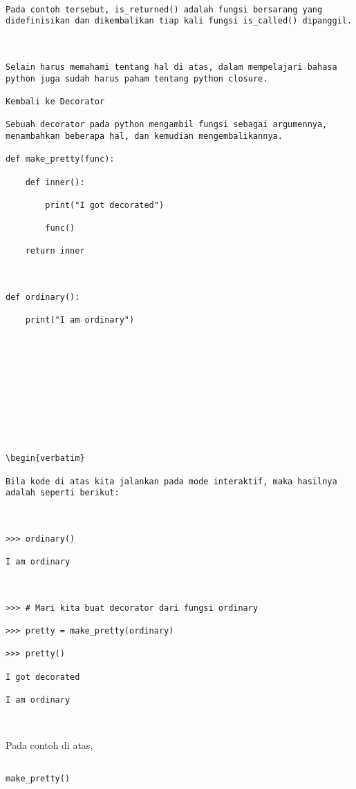 \documentclass[12pt,a4paper]{article}
\begin{document}
\begin{verbatim}

Pada contoh tersebut, is_returned() adalah fungsi bersarang yang didefinisikan dan dikembalikan tiap kali fungsi is_called() dipanggil.



Selain harus memahami tentang hal di atas, dalam mempelajari bahasa python juga sudah harus paham tentang python closure.

Kembali ke Decorator

Sebuah decorator pada python mengambil fungsi sebagai argumennya, menambahkan beberapa hal, dan kemudian mengembalikannya.

def make_pretty(func):

    def inner():

        print("I got decorated")

        func()

    return inner



def ordinary():

    print("I am ordinary")











\begin{verbatim}

Bila kode di atas kita jalankan pada mode interaktif, maka hasilnya adalah seperti berikut:



>>> ordinary()

I am ordinary



>>> # Mari kita buat decorator dari fungsi ordinary

>>> pretty = make_pretty(ordinary)

>>> pretty()

I got decorated

I am ordinary



\end{verbatim}



Pada contoh di atas, 

\begin{verbatim}

make_pretty()

\end{verbatim}  
\end{document}
